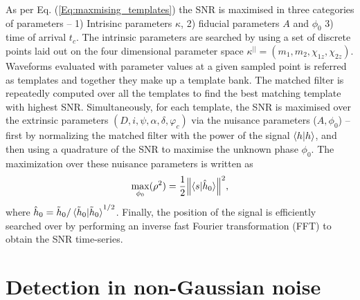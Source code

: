 As per Eq. (\ref{Eq:maxmising_templates}) the SNR is maximised in three categories of parameters -- 1) Intrisinc parameters $\kappa$, 2) fiducial parameters $A$ and $\phi_0$ 3) time of arrival $t_c$. The intrinsic parameters are searched by using a set of discrete points laid out on the four dimensional parameter space $\kappa^{||} = (m_1, m_2, \chi_{1z}, \chi_{2z})$. Waveforms evaluated with parameter values at a given sampled point is referred as templates and together they make up a template bank. The matched filter is repeatedly computed over all the templates to find the best matching template with highest SNR. Simultaneously, for each template, the SNR is maximised over the extrinsic parameters $(D, i, \psi, \alpha, \delta, \varphi_c)$ via the nuisance parameters ($A, \phi_0$) -- first by normalizing the matched filter with the power of the signal $\braket{h|h}$, and then using a quadrature of the SNR to maximise the unknown phase $\phi_0$. The maximization over these nuisance parameters is written as 
\begin{align}
    \mathop{\max}_{\phi_{0}}(\rho^2) = \dfrac{1}{2}\norm{\braket{s|\hat{h}_0}}^2,
    \label{Eq:simplified_statistics}
\end{align}
where $\hat{h}_0 = \tilde{h}_0/\braket{\tilde{h}_0|\tilde{h}_0}^{1/2}$. Finally, the position of the signal is efficiently searched over by performing an inverse fast Fourier transformation (FFT) to obtain the SNR time-series.

\section{Detection in non-Gaussian noise}

\section{}